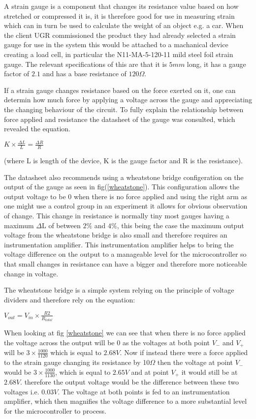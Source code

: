 A strain gauge is a component that changes its resistance value based on how stretched or compressed it is, it is therefore good for use in measuring strain which can in turn be used to calculate the weight of an object e.g. a car. When the client UGR commissioned the product they had already selected a strain gauge for use in the system this would be attached to a machanical device creating a load cell, in particular the N11-MA-5-120-11 mild steel foil strain gauge. The relevant specifications of this are that it is $5mm$ long, it has a gauge factor of $2.1$ and has a base resistance of $120\Omega$.

If a strain gauge changes resistance based on the force exerted on it, one can determin how much force by applying a voltage across the gauge and appreciating the changing behaviour of the circuit. To fully explain the relationship between force applied and resistance the datasheet of the gauge was consulted, which revealed the equation.


\centerline{$K \times \frac{\Delta L}{L} = \frac{\Delta R}{R}$}

 (where L is length of the device, K is the gauge factor and R is the resistance).  

The datasheet also recommends using a wheatstone bridge configeration on the output of the gauge as seen in fig(\ref{wheatstone}). This configuration allows the output voltage to be $0$ when there is no force applied and using the right arm as one might use a control group in an experiment it allows for obvious observation of change. This change in resistance is normally tiny most gauges having a maximum $\Delta$L of between $2\%$ and $4\%$, this being the case the maximum output voltage from the wheatstone bridge is also small and therefore requires an instrumentation amplifier. This instrumentation amplifier helps to bring the voltage difference on the output to a manageable level for the microcontroller so that small changes in resistance can have a bigger and therefore more noticeable change in voltage. 

The wheatstone bridge is a simple system relying on the principle of voltage dividers and therefore rely on the equation:

\centerline{$V_{out} = V_{in} \times \frac{R2}{R_{total}}$}

When looking at fig \ref{wheatstone} we can see that when there is no force applied the voltage across the output will be $0$ as the voltages at both point $V_-$ and $V_+$ will be $3 \times \frac{1000}{1120}$ which is equal to $2.68V$. Now if instead there were a force applied to the strain gauge changing its resistance by 10$\Omega$ then the voltage at point $V_-$ would be $3 \times \frac{1000}{1130}$, which is equal to $2.65V$ and at point $V_+$ it would still be at $2.68V$. therefore the output voltage would be the difference between these two voltages i.e. $0.03V$. The voltage at both points is fed to an instrumentation amplifier, which then magnifies the voltage difference to a more substantial level for the microcontroller to process. 

